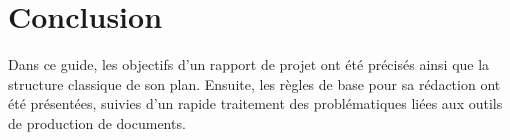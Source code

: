 \section{Conclusion}

Dans ce guide, les objectifs d'un rapport de projet ont
été précisés ainsi que la structure classique de son plan. Ensuite,
les règles de base pour sa rédaction ont été présentées, suivies d'un
rapide traitement des problématiques liées aux outils de production de
documents. 



